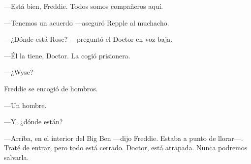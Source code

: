 {---Está bien, Freddie. Todos somos compañeros aquí.}

{---Tenemos un acuerdo ---aseguró Repple al muchacho.}

{---¿Dónde está Rose? ---preguntó el Doctor en voz baja.}

{---Él la tiene, Doctor. La cogió prisionera.}

{---¿Wyse?}

{Freddie se encogió de hombros.}

{---Un hombre.}

{---Y, ¿dónde están?}

{---Arriba, en el interior del Big Ben ---dijo Freddie. Estaba a punto
	de llorar---. Traté de entrar, pero todo está cerrado. Doctor, está
atrapada. Nunca podremos salvarla.}
